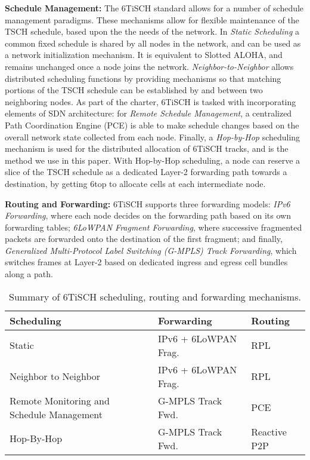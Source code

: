 \textbf{Schedule Management:}
The 6TiSCH standard allows for a number of schedule management paradigms. These mechanisms allow for flexible maintenance of the TSCH schedule, based upon the the needs of the network. In \textit{Static Scheduling} a common fixed schedule is shared by all nodes in the network, and can be used as a network initialization mechanism. It is equivalent to Slotted ALOHA, and remains unchanged once a node joins the network. \textit{Neighbor-to-Neighbor} allows distributed scheduling functions by providing mechanisms so that matching portions of the TSCH schedule can be established by and between two neighboring nodes. As part of the charter, 6TiSCH is tasked with incorporating elements of SDN architecture: for \textit{Remote Schedule Management}, a centralized Path Coordination Engine (PCE) is able to make schedule changes based on the overall network state collected from each node. Finally, a \textit{Hop-by-Hop} scheduling mechanism is used for the distributed allocation of 6TiSCH tracks, and is the method we use in this paper. With Hop-by-Hop scheduling, a node can reserve a slice of the TSCH schedule as a dedicated Layer-2 forwarding path towards a destination, by getting 6top to allocate cells at each intermediate node.

\textbf{Routing and Forwarding:} 
6TiSCH supports three forwarding models: \textit{IPv6 Forwarding}, where each node decides on the forwarding path based on its own forwarding tables; \textit{6LoWPAN Fragment Forwarding}, where successive fragmented packets are forwarded onto the destination of the first fragment; and finally, \textit{Generalized Multi-Protocol Label Switching (G-MPLS) Track Forwarding}, which switches frames at Layer-2 based on dedicated ingress and egress cell bundles along a path.


\begin{table}[ht]
	\renewcommand{\arraystretch}{1.0}
	\caption{Summary of 6TiSCH scheduling, routing and forwarding mechanisms.}
    \label{table:6tisch_shed_rout_fwd}
	\centering
    \begin{tabular}{ |m{3cm}|l|l| }
    \hline
      	\bfseries Scheduling & \bfseries Forwarding & \bfseries Routing\\ \hline
		Static & IPv6 + 6LoWPAN Frag. & RPL \\ \hline
        Neighbor to Neighbor & IPv6 + 6LoWPAN Frag. & RPL \\ \hline
        Remote Monitoring and Schedule Management & G-MPLS Track Fwd. & PCE \\ \hline
        Hop-By-Hop & G-MPLS Track Fwd. & Reactive P2P  \\
    \hline
    \end{tabular}
\end{table}

